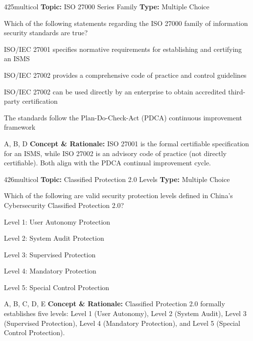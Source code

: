 \begin{qcard}{425}{multicol}
\textcolor{darkslate!75}{\small\textbf{Topic:} ISO 27000 Series Family \hfill \textbf{Type:} Multiple Choice}\vspace{0.4em}\par
Which of the following statements regarding the ISO 27000 family of information security standards are true?
\begin{qoptions}
\item ISO/IEC 27001 specifies normative requirements for establishing and certifying an ISMS
\item ISO/IEC 27002 provides a comprehensive code of practice and control guidelines
\item ISO/IEC 27002 can be used directly by an enterprise to obtain accredited third-party certification
\item The standards follow the Plan-Do-Check-Act (PDCA) continuous improvement framework
\end{qoptions}
\end{qcard}
\nopagebreak
\begin{explainbox}{A, B, D}
\textbf{Concept \& Rationale:} ISO 27001 is the formal certifiable specification for an ISMS, while ISO 27002 is an advisory code of practice (not directly certifiable). Both align with the PDCA continual improvement cycle.
\end{explainbox}

\begin{qcard}{426}{multicol}
\textcolor{darkslate!75}{\small\textbf{Topic:} Classified Protection 2.0 Levels \hfill \textbf{Type:} Multiple Choice}\vspace{0.4em}\par
Which of the following are valid security protection levels defined in China's Cybersecurity Classified Protection 2.0?
\begin{qoptions}
\item Level 1: User Autonomy Protection
\item Level 2: System Audit Protection
\item Level 3: Supervised Protection
\item Level 4: Mandatory Protection
\item Level 5: Special Control Protection
\end{qoptions}
\end{qcard}
\nopagebreak
\begin{explainbox}{A, B, C, D, E}
\textbf{Concept \& Rationale:} Classified Protection 2.0 formally establishes five levels: Level 1 (User Autonomy), Level 2 (System Audit), Level 3 (Supervised Protection), Level 4 (Mandatory Protection), and Level 5 (Special Control Protection).
\end{explainbox}

